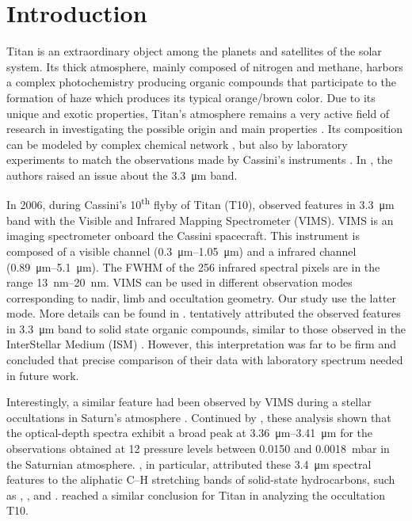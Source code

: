 \documentclass{arxiv-icarus}
\begin{document}
\section{Introduction}

Titan is an extraordinary object among the planets and satellites of the solar system. Its thick atmosphere,
mainly composed of nitrogen and methane, harbors a complex photochemistry producing organic compounds that participate to the formation
of haze which produces its typical orange/brown color. Due to its unique and exotic properties, Titan's atmosphere remains a very active field of research in investigating the possible origin and main properties \citep{Johnson2016,Charnay2014a,Newman2016}.
Its composition can be modeled by complex chemical network \citep{Krasnopolsky2014,Lavvas2015}, but also by laboratory experiments
\citep{Bourgalais2016,Romanzin2016} to match the observations made by Cassini's instruments
\citep{Vinatier2015,Coustenis2016,Bellucci2009}. In \cite{Bellucci2009}, the authors raised an issue about the  \SI{3.3}{\um} band.

In 2006, during Cassini's 10\textsuperscript{th} flyby of Titan (T10), \cite{Bellucci2009} observed features in  \SI{3.3}{\um} band with the Visible and Infrared Mapping Spectrometer (VIMS). VIMS is an imaging spectrometer onboard the Cassini spacecraft. This instrument is composed of a visible channel (\SIrange{0.3}{1.05}{\um}) and a infrared channel (\SIrange{0.89}{5.1}{\um}).
The FWHM of the 256 infrared spectral pixels are in the range \SIrange{13}{20}{nm}. VIMS can be used in different observation modes corresponding to nadir, limb and occultation geometry. Our study use the latter mode. More details can be found in \cite{Maltagliati2015}. \cite{Bellucci2009} tentatively attributed the observed features in  \SI{3.3}{\um} band to solid state organic compounds, similar to those observed in the InterStellar Medium (ISM)
\citep{Sandford1991,Pendleton2002}. However, this interpretation was far to be
firm and \cite{Bellucci2009} concluded that precise comparison of their data with laboratory spectrum needed in future work.

Interestingly, a similar feature had been observed by VIMS during a stellar occultations in Saturn's atmosphere \citep{Nicholson2006,Kim2012}. Continued by \cite{Kim2012}, these analysis shown that the optical-depth spectra exhibit a broad peak at \SIrange{3.36}{3.41}{\um} for the observations obtained at 12 pressure levels between
0.0150 and \SI{0.0018}{mbar} in the Saturnian atmosphere. \cite{Kim2012}, in particular, attributed these \SI{3.4}{\um} spectral features to the aliphatic C--H stretching bands of solid-state hydrocarbons, such as , ,  and . \cite{Kim2011} reached a similar conclusion for Titan in analyzing the occultation T10.
\end{document}
